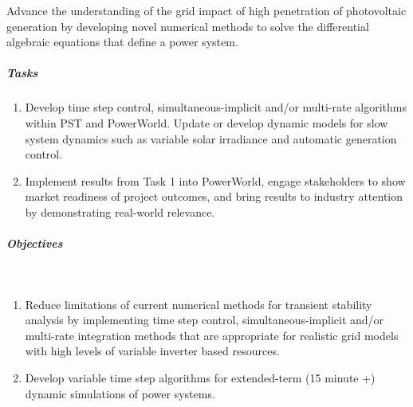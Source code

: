 \documentclass[12pt]{article}
\begin{document}
Advance the understanding of the grid impact of high penetration of photovoltaic generation by developing novel numerical methods to solve the differential algebraic equations that define a power system.

\subparagraph{Tasks}
\begin{enumerate}
\item Develop time step control, simultaneous-implicit and/or multi-rate algorithms within PST and PowerWorld.
Update or develop dynamic models for slow system dynamics such as variable solar irradiance and automatic generation control.
\item Implement results from Task 1 into PowerWorld, engage stakeholders to show market readiness of project outcomes, and bring results to industry attention by demonstrating real-world relevance.
\end{enumerate}
\subparagraph{Objectives} \ \\
\begin{enumerate}
\item Reduce limitations of current numerical methods for transient stability analysis by implementing time step control, simultaneous-implicit and/or multi-rate integration methods that are appropriate for realistic grid models with high levels of variable inverter based resources.
\item Develop variable time step algorithms for extended-term (15 minute +) dynamic simulations of power systems.
\end{enumerate}
\end{document}
